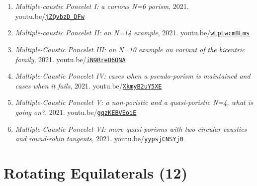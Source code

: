 \documentclass[12pt]{article}
\begin{document}
\begin{enumerate}[resume]
\item \textit{Multiple-caustic Poncelet I: a curious N=6 porism}, 2021. youtu.be/\href{https://youtu.be/jZQvbzD_DFw}{\nolinkurl{jZQvbzD\_DFw}}
\item \textit{Multiple-caustic Poncelet II: an N=14 example}, 2021. youtu.be/\href{https://youtu.be/wLpLwcmBLms}{\nolinkurl{wLpLwcmBLms}}
\item \textit{Multiple-Caustic Poncelet III: an N=10 example on variant of the bicentric family}, 2021. youtu.be/\href{https://youtu.be/iN9RreO6ONA}{\nolinkurl{iN9RreO6ONA}}
\item \textit{Multiple-Caustic Poncelet IV: cases when a pseudo-porism is maintained and cases when it fails}, 2021. youtu.be/\href{https://youtu.be/XkmyB2uY5XE}{\nolinkurl{XkmyB2uY5XE}}
\item \textit{Multiple-Caustic Poncelet V: a non-poristic and a quasi-poristic N=4, what is going on?}, 2021. youtu.be/\href{https://youtu.be/gqzKEBVEoiE}{\nolinkurl{gqzKEBVEoiE}}
\item \textit{Multiple-Caustic Poncelet VI: more quasi-porisms with two circular caustics and round-robin tangents}, 2021. youtu.be/\href{https://youtu.be/yypsjCNSYj0}{\nolinkurl{yypsjCNSYj0}}
\end{enumerate}

\section{Rotating Equilaterals (12)}
\end{document}

